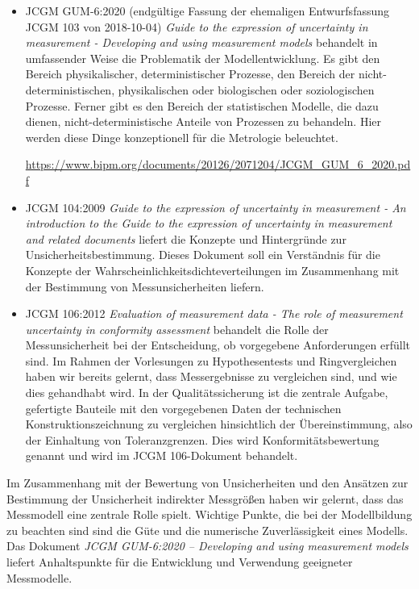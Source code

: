 \begin{itemize}
\item JCGM GUM-6:2020 (endgültige Fassung der ehemaligen Entwurfsfassung JCGM 103 von 2018-10-04) \textsl{Guide to the expression of uncertainty in measurement
- Developing and using measurement models} behandelt in umfassender Weise die Problematik der
Modellentwicklung. Es gibt den Bereich physikalischer, deterministischer Prozesse,
den Bereich der nicht-deterministischen, physikalischen oder biologischen oder soziologischen
Prozesse. Ferner gibt es den Bereich der statistischen Modelle, die dazu dienen, nicht-deterministische
Anteile von Prozessen zu behandeln. Hier werden diese Dinge konzeptionell
für die Metrologie beleuchtet.

\url{https://www.bipm.org/documents/20126/2071204/JCGM_GUM_6_2020.pdf}

\item JCGM 104:2009 \textsl{Guide to the expression of uncertainty in measurement
- An introduction to the Guide to the expression of
uncertainty in measurement and related documents} liefert die Konzepte und Hintergründe zur
Unsicherheitsbestimmung. Dieses Dokument soll ein Verständnis für die Konzepte der
Wahrscheinlichkeitsdichteverteilungen im Zusammenhang mit der Bestimmung von Messunsicherheiten liefern.

\item JCGM 106:2012 \textsl{Evaluation of measurement data - The role of
measurement uncertainty in conformity assessment} behandelt die Rolle der Messunsicherheit bei der Entscheidung, ob vorgegebene Anforderungen erfüllt sind. Im Rahmen der Vorlesungen zu Hypothesentests und
Ringvergleichen haben wir bereits gelernt, dass Messergebnisse zu vergleichen sind, und wie dies
gehandhabt wird. In der Qualitätssicherung ist die zentrale Aufgabe, gefertigte Bauteile mit den
vorgegebenen Daten der technischen Konstruktionszeichnung zu vergleichen hinsichtlich der Übereinstimmung,
also der Einhaltung von Toleranzgrenzen. Dies wird Konformitätsbewertung genannt und wird im
JCGM 106-Dokument behandelt.
\end{itemize}

Im Zusammenhang mit der Bewertung von Unsicherheiten und den Ansätzen zur Bestimmung der Unsicherheit indirekter Messgrößen haben wir gelernt, dass das Messmodell eine zentrale Rolle spielt. Wichtige Punkte, die bei der Modellbildung zu beachten sind sind die Güte und die numerische Zuverlässigkeit eines Modells. Das Dokument \textsl{JCGM GUM-6:2020 -- Developing and using measurement models} liefert Anhaltspunkte für die Entwicklung und Verwendung geeigneter Messmodelle.

